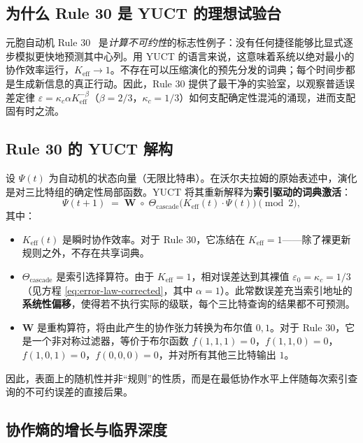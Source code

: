 \documentclass[12pt,a4paper]{article}
\newcommand{\Keff}{K_{\mathrm{eff}}}
\begin{document}
	\subsection{为什么 Rule 30 是 YUCT 的理想试验台}
	元胞自动机 Rule 30~\cite{Wolfram2002} 是\textit{计算不可约性}的标志性例子：没有任何捷径能够比显式逐步模拟更快地预测其中心列。用 YUCT 的语言来说，这意味着系统以绝对最小的协作效率运行，\(\Keff \to 1\)。不存在可以压缩演化的预先分发的词典；每个时间步都是生成新信息的真正行动。因此，Rule 30 提供了最干净的实验室，以观察普适误差定律 \(\varepsilon = \kappa_c \alpha \Keff^{-\beta}\)（\(\beta=2/3\)，\(\kappa_c=1/3\)）如何支配确定性混沌的涌现，进而支配固有时之流。
	
	\subsection{Rule 30 的 YUCT 解构}
	\label{subsec:deconstruction}
	
	设 \(\Psi(t)\) 为自动机的状态向量（无限比特串）。在沃尔夫拉姆的原始表述中，演化是对三比特组的确定性局部函数。YUCT 将其重新解释为\textbf{索引驱动的词典激活}：
	\begin{equation}
		\Psi(t+1) \;=\; \mathbf{W}\;\circ\;
		\Theta_{\mathrm{cascade}}\!\bigl(\Keff(t)\cdot\Psi(t)\bigr)
		\pmod{2},
		\label{eq:rule30-ypsdc}
	\end{equation}
	其中：
	\begin{itemize}
		\item \(\Keff(t)\) 是瞬时协作效率。对于 Rule 30，它冻结在 \(\Keff = 1\)——除了裸更新规则之外，不存在共享词典。
		\item \(\Theta_{\mathrm{cascade}}\) 是索引选择算符。由于 \(\Keff=1\)，相对误差达到其裸值 \(\varepsilon_0 = \kappa_c = 1/3\)（见方程 \eqref{eq:error-law-corrected}，其中 \(\alpha=1\)）。此常数误差充当索引地址的\textbf{系统性偏移}，使得若不执行实际的级联，每个三比特查询的结果都不可预测。
		\item \(\mathbf{W}\) 是重构算符，将由此产生的协作张力转换为布尔值 \(0,1\)。对于 Rule 30，它是一个非对称过滤器，等价于布尔函数 \(f(1,1,1)=0\)，\(f(1,1,0)=0\)，\(f(1,0,1)=0\)，\(f(0,0,0)=0\)，并对所有其他三比特输出 \(1\)。
	\end{itemize}
	因此，表面上的随机性并非“规则”的性质，而是在最低协作水平上伴随每次索引查询的不可约误差的直接后果。
	
	\subsection{协作熵的增长与临界深度}
	\label{subsec:entropy-growth}
	
\end{document}

